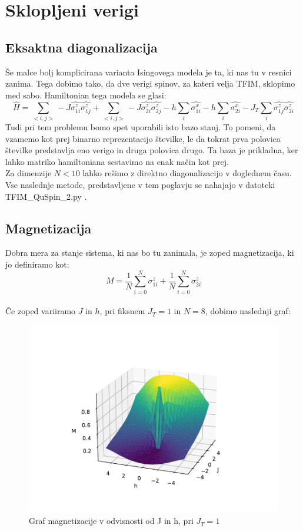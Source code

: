 \documentclass{article}
\begin{document}
\section{Sklopljeni verigi}
\subsection{Eksaktna diagonalizacija}
Še malce bolj komplicirana varianta Isingovega modela je ta, ki nas tu v resnici zanima. Tega dobimo tako, da dve verigi spinov, za kateri velja TFIM, sklopimo med sabo. Hamiltonian tega modela se glasi:
\begin{equation}
    \hat{H} = \sum_{< i,j >} -J \hat{\sigma_{1i}^z} \hat{\sigma_{1j}^z} + \sum_{< i,j >} -J \hat{\sigma_{2i}^z} \hat{\sigma_{2j}^z} - h\sum_i \hat{\sigma_{1i}^x}- h\sum_i \hat{\sigma_{2i}^x} - J_T \sum_i \hat{\sigma_{1j}^z} \hat{\sigma_{2i}^z}
\end{equation}
Tudi pri tem problemu bomo spet uporabili isto bazo stanj. To pomeni, da vzamemo kot prej binarno reprezentacijo številke, le da tokrat prva polovica številke predstavlja eno verigo in druga polovica drugo. Ta baza je prikladna, ker lahko matriko hamiltoniana sestavimo na enak način kot prej.\\ 
Za dimenzije $N < 10$ lahko rešimo z direktno diagonalizacijo v doglednem času. Vse naslednje metode, predstavljene v tem poglavju se nahajajo v datoteki TFIM\_QuSpin\_2.py .
\subsection{Magnetizacija}
Dobra mera za stanje sistema, ki nas bo tu zanimala, je zoped magnetizacija, ki jo definiramo kot:
\begin{equation}
    M = \frac{1}{N}\sum_{i=0}^N \sigma_{1i}^z + \frac{1}{N}\sum_{i=0}^N \sigma_{2i}^z
\end{equation}\\

\noindent Če zoped variiramo $J$ in $h$, pri fiksnem $J_T = 1$ in $N = 8$, dobimo naslednji graf:

\begin{figure}[H]
\includegraphics[]{TFIM2_3D_J_h_N=8.pdf}
\caption{Graf magnetizacije v odvisnosti od J in h, pri $J_T = 1$}
\end{figure}
\end{document}
